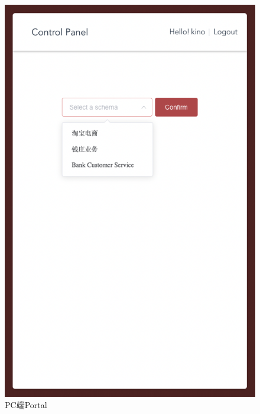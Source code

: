 \documentclass[hyperref]{ctexart}
\begin{document}
\begin{multicols}{2}
\begin{figure}[H]
        \includegraphics[scale=0.2]{figure/9.png}
        \caption{PC端Portal}
        \label{Fig.1.9}
    \end{figure}
    \begin{figure}[H]
        \centering

\end{figure}
\end{multicols}
\end{document}

